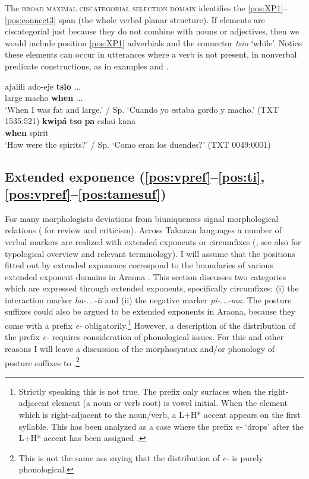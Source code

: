 \documentclass[output=paper,hidelinks]{langscibook}
\begin{document}
The \textsc{broad maximal ciscategorial selection domain} identifies the \ref{pos:XP1}--\ref{pos:connect3} span (the whole verbal planar structure). If elements are ciscategorial just because they do not combine with nouns or adjectives, then we would include position \ref{pos:XP1} adverbials and the connector \textit{tsio} `while'. Notice these elements can occur in utterances where a verb is not present, in nonverbal predicate constructions, as in examples  and .

\ea 
 \ea\label{ex:tsionv1}
    \gll ajalili ado-eje \textbf{tsio} ... \\
    large macho \textbf{when} ...  \\
    \glt `When I was fat and large.' / Sp. `Cuando yo estaba gordo y macho.'  \hfill (TXT 1535:521)
 \ex \label{ex:tsionv2}
    \gll\textbf{kwipá} \textbf{tso} \textbf{pa} eshai kana \\
    \textbf{when} \textbf{\Ant{}} \textbf{\Rep{}} spirit \Pl{}  \\
    \glt `How were the spirits?' / Sp. `Como eran los duendes?'  \hfill (TXT 0049:0001)
 \z
\z 


\subsection{Extended exponence (\ref{pos:vpref}--\ref{pos:ti},  \ref{pos:vpref}--\ref{pos:tamesuf})}
\label{sec:extendedexponence}

For many morphologists deviations from biuniqueness signal morphological relations (\citealt{TallmanEpps2020} for review and criticism). Across Takanan languages a number of verbal markers are realized with extended exponents or circumfixes (\citealt{guillaume:forthcoming}, see also \citet{harris2017} for typological overview and relevant terminology). I will assume that the positions fitted out by extended exponence correspond to the boundaries of various extended exponent domains in Araona \citep{Tallman2021}. This section discusses two categories which are expressed through extended exponents, specifically circumfixes: (i) the interaction marker \textit{ha-...-ti} and (ii) the negative marker \textit{pi-...-ma}. The posture suffixes could also be argued to be extended exponents in Araona, because they come with a prefix \textit{e-} obligatorily.\footnote{Strictly speaking this is not true. The prefix only surfaces when the right-adjacent element (a noun or verb root) is vowel initial. When the  element which is right-adjacent to the noun/verb, a L+H* accent appears on the first syllable. This has been analyzed as a case where the prefix \textit{e-} `drops' after the L+H* accent has been assigned \citep{pitmanpitman1976, pitman:1980:araonasketch}.} However, a description of the distribution of the prefix \textit{e-} requires consideration of phonological issues. For this and other reasons I will leave a discussion of the morphosyntax and/or phonology of posture suffixes to .\footnote{This is not the same ass saying that the distribution of \textit{e-} is purely phonological.}
\end{document}
